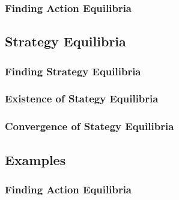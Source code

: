 \subsubsection{Finding Action Equilibria}

\subsection{Strategy Equilibria}

\subsubsection{Finding Strategy Equilibria}

\subsubsection{Existence of Stategy Equilibria}

\subsubsection{Convergence of Stategy Equilibria}

\subsection{Examples}
\subsubsection{Finding Action Equilibria}

